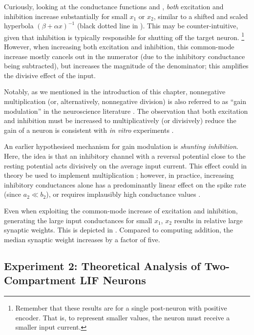 Curiously, looking at the conductance functions \gE and \gI, \emph{both} excitation and inhibition increase substantially for small $x_1$ or $x_2$, similar to a shifted and scaled hyperbola  $(\beta + \alpha x)^{-1}$ (black dotted line in ).
This may be counter-intuitive, given that inhibition is typically responsible for shutting off the target neuron.%
\footnote{Remember that these results are for a single post-neuron with positive encoder. That is, to represent smaller values, the neuron must receive a smaller input current.}
However, when increasing both excitation and inhibition, this common-mode increase mostly cancels out in the numerator (due to the inhibitory conductance being subtracted), but increases the magnitude of the denominator; this amplifies the divisive effect of the input.

Notably, as we mentioned in the introduction of this chapter, nonnegative multiplication (or, alternatively, nonnegative division) is also referred to as \enquote{gain modulation} in the neuroscience literature \citep{salinas2000gain}.
The observation that both excitation and inhibition must be increased to multiplicatively (or divisively) reduce the gain of a neuron is consistent with \emph{in vitro} experiments \citep{chance2002gain}.

An earlier hypothesised mechanism for gain modulation is \emph{shunting inhibition}.
Here, the idea is that an inhibitory channel with a reversal potential close to the resting potential acts divisively on the average input current.
This effect could in theory be used to implement multiplication \citep{koch1992multiplying}; however, in practice, increasing inhibitory conductances alone has a predominantly linear effect on the spike rate (since $a_2 \ll b_2$), or requires implausibly high conductance values \citep{holt1997shunting,abbott2005drivers}.

Even when exploiting the common-mode increase of excitation and inhibition, generating the large input conductances for small $x_1$, $x_2$ results in relative large synaptic weights.
This is depicted in .
Compared to computing addition, the median synaptic weight increases by a factor of five.

\subsection{Experiment 2: Theoretical Analysis of Two-Compartment LIF Neurons}
\label{sec:two_comp_lif_experiment_2}

